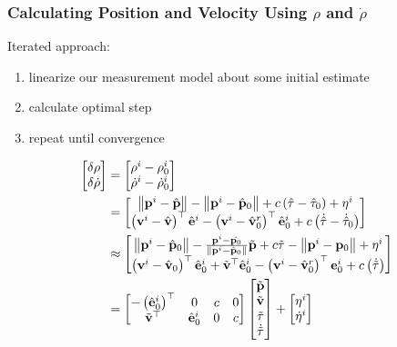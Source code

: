 \documentclass{beamer}
\newcommand{\norm}[1]{\left\lVert#1\right\rVert}
\begin{document}
\begin{frame}\frametitle{Calculating Position and Velocity Using $\rho$ and $\dot{\rho}$}
Iterated approach:
\begin{enumerate}
	\item linearize our measurement model about some initial estimate
	\item calculate optimal step
	\item repeat until convergence
\end{enumerate}
\begin{align}
\begin{bmatrix}\delta\rho\\
\delta\dot{\rho}
\end{bmatrix} & =\begin{bmatrix}\rho^{i}-\rho{}_{0}^{i}\\
\dot{\rho}^{i}-\dot{\rho}{}_{0}^{i}
\end{bmatrix}\\
& =\begin{bmatrix}\norm{\p^{i}-\hat{\p}}-\norm{\p^{i}-\hat{\p}_{0}}+c\left(\hat{\tau}-\hat{\tau}_{0}\right)+\eta^{i}\\
\left(\v^{i}-\hat{\v}\right)^{\top}\hat{\e}^{i}-\left(\v^{i}-\hat{\v}_{0}^{r}\right)^{\top}\hat{\e}_{0}^{i}+c\left(\dot{\hat{\tau}}-\dot{\hat{\tau}}_{0}\right)
\end{bmatrix}\\
& \approx\begin{bmatrix}\norm{\p^{i}-\hat{\p}_{0}}-\frac{\p^{i}-\hat{\p_{0}}}{\norm{\p^{i}-\hat{\p}_{0}}}\tilde{\p}+c\tilde{\tau}-\norm{\p^{i}-\p_{0}}+\eta^{i}\\
\left(\v^{i}-\hat{\v}_{0}\right)^{\top}\hat{\e}_{0}^{i}+\tilde{\v}^{\top}\hat{\e}_{0}^{i}-\left(\v^{i}-\hat{\v}_{0}^{r}\right)^{\top}\e_{0}^{i}+c\left(\dot{\tilde{\tau}}\right)
\end{bmatrix}\\
& =\begin{bmatrix}-\left(\hat{\e}_{0}^{i}\right)^{\top} & 0 & c & 0\\
\tilde{\v}^{\top} & \hat{\e}_{0}^{i} & 0 & c
\end{bmatrix}\begin{bmatrix}\tilde{\p}\\
\tilde{\v}\\
\tilde{\tau}\\
\dot{\tilde{\tau}}
\end{bmatrix}+\begin{bmatrix}\eta^{i}\\
\dot{\eta}^{i}
\end{bmatrix}
\end{align}
\end{frame}
\end{document}
